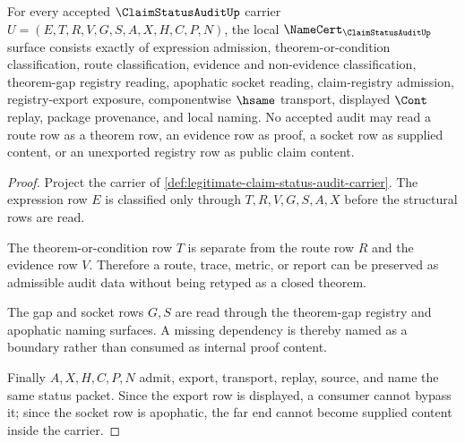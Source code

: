 \begin{theorem}
\label{thm:legitimate-claim-status-audit-namecert-obligations}
For every accepted $\ClaimStatusAuditUp$ carrier $U=(E,T,R,V,G,S,A,X,H,C,P,N)$, the local $\NameCert_{\ClaimStatusAuditUp}$ surface consists exactly of expression admission, theorem-or-condition classification, route classification, evidence and non-evidence classification, theorem-gap registry reading, apophatic socket reading, claim-registry admission, registry-export exposure, componentwise $\hsame$ transport, displayed $\Cont$ replay, package provenance, and local naming. No accepted audit may read a route row as a theorem row, an evidence row as proof, a socket row as supplied content, or an unexported registry row as public claim content.
\end{theorem}
\begin{proof}
Project the carrier of \autoref{def:legitimate-claim-status-audit-carrier}. The expression row $E$ is classified only through $T,R,V,G,S,A,X$ before the structural rows are read.

The theorem-or-condition row $T$ is separate from the route row $R$ and the evidence row $V$. Therefore a route, trace, metric, or report can be preserved as admissible audit data without being retyped as a closed theorem.

The gap and socket rows $G,S$ are read through the theorem-gap registry and apophatic naming surfaces. A missing dependency is thereby named as a boundary rather than consumed as internal proof content.

Finally $A,X,H,C,P,N$ admit, export, transport, replay, source, and name the same status packet. Since the export row is displayed, a consumer cannot bypass it; since the socket row is apophatic, the far end cannot become supplied content inside the carrier.
\end{proof}

